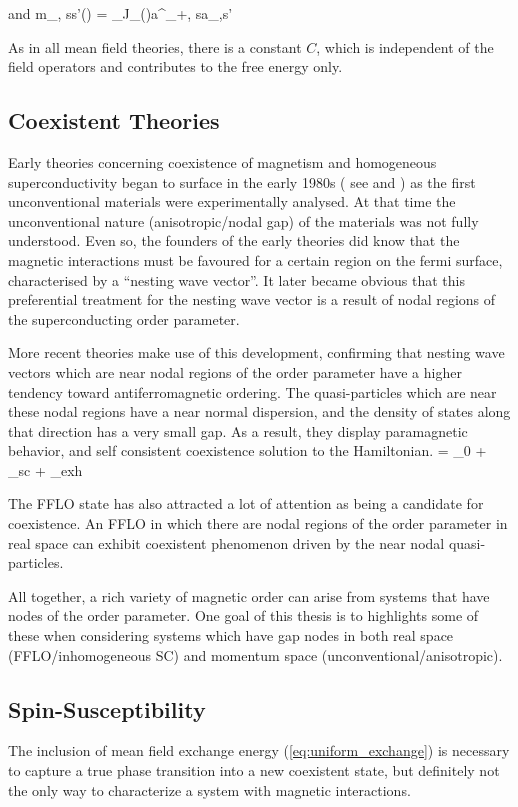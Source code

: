 and 
\be
m_{\alpha\beta, ss'}(\vq) = \sum_{\vk}J_{\alpha\beta}(\vq)\langle a^\dagger_{\vk+\vq, s}a_{\vk,s'} \rangle
\ee

As in all mean field theories, there is a constant $C$, which is independent of the field operators and contributes to the free energy only.

\subsection{\label{ch:2.5.1}Coexistent Theories}

Early theories concerning coexistence of magnetism and homogeneous superconductivity began to surface in the early 1980s ( see \citep{doi:10.1143/JPSJ.50.2195} and \citep{raey}) as the first unconventional materials were experimentally analysed. At that time the unconventional nature (anisotropic/nodal gap) of the materials was not fully understood. Even so, the founders of the early theories did know that the magnetic interactions must be favoured for a certain region on the fermi surface, characterised by a ``nesting wave vector''. It later became obvious that this preferential treatment for the nesting wave vector is a result of nodal regions of the superconducting order parameter. 

More recent theories make use of this development, confirming that nesting wave vectors which are near nodal regions of the order parameter have a higher tendency toward antiferromagnetic ordering. The quasi-particles which are near these nodal regions have a near normal dispersion, and the density of states along that direction has a very small gap. As a result, they display paramagnetic behavior, and self consistent coexistence solution to the Hamiltonian.
\be
\cH = \cH_0 + \cH_{sc} + \cH_{exh}
\ee

The FFLO state has also attracted a lot of attention as being a candidate for coexistence. An FFLO in which there are nodal regions of the order parameter in real space can exhibit coexistent phenomenon driven by the near nodal quasi-particles.

All together, a rich variety of magnetic order can arise from systems that have nodes of the order parameter. One goal of this thesis is to highlights some of these when considering systems which have gap nodes in both real space (FFLO/inhomogeneous SC) and momentum space (unconventional/anisotropic). 

\subsection{\label{ch:2.5.2}Spin-Susceptibility}
The inclusion of mean field exchange energy (\ref{eq:uniform_exchange}) is necessary to capture a true phase transition into a new coexistent state, but definitely not the only way to characterize a system with magnetic interactions. 

